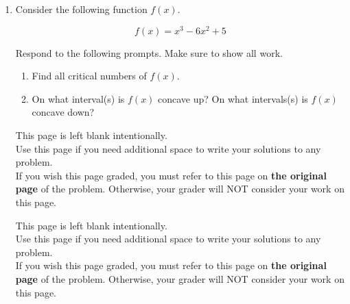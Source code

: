 \documentclass[11pt]{article}
\begin{document}
\begin{enumerate}
\begin{enumerate}
\item $\dfrac{\ln(x)+x^2}{x^3-2x}$

\vfill

\item $4\sqrt{x}\left(e^2+3x^4\right)^2$

\vfill 
\end{enumerate}



\newpage


\item Consider the following function $f(x)$.

\[f(x)=x^3-6x^2+5\]

Respond to the following prompts. Make sure to show all work.

\begin{enumerate}
    \item Find all critical numbers of $f(x)$.

    \vfill

    \item On what interval(s) is $f(x)$ concave up? On what intervals(s) is $f(x)$ concave down?

    \vfill
\end{enumerate}



\newpage

This page is left blank intentionally.\\

Use this page if you need additional space to write your solutions to any problem. \\

If you wish this page graded, you must refer to this page on \textbf{the original page} of the problem. Otherwise, your grader will NOT consider your work on this page.

\newpage

This page is left blank intentionally.\\

Use this page if you need additional space to write your solutions to any problem. \\

If you wish this page graded, you must refer to this page on \textbf{the original page} of the problem. Otherwise, your grader will NOT consider your work on this page.

\end{enumerate}
\end{document}
